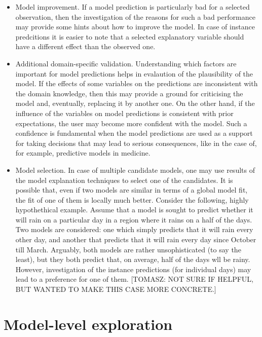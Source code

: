 \documentclass[12pt,]{krantz}
\begin{document}
\begin{itemize}
\item
  Model improvement. If a model prediction is particularly bad for a selected observation, then the investigation of the reasons for such a bad performance may provide some hints about how to improve the model. In case of instance predcitions it is easier to note that a selected explanatory variable should have a different effect than the observed one.
\item
  Additional domain-specific validation. Understanding which factors are important for model predictions helps in evalaution of the plausibility of the model. If the effects of some variables on the predictions are inconsistent with the domain knowledge, then this may provide a ground for criticising the model and, eventually, replacing it by another one. On the other hand, if the influence of the variables on model predictions is consistent with prior expectations, the user may become more confident with the model. Such a confidence is fundamental when the model predictions are used as a support for taking decisions that may lead to serious consequences, like in the case of, for example, predictive models in medicine.
\item
  Model selection. In case of multiple candidate models, one may use results of the model explanation techniques to select one of the candidates. It is possible that, even if two models are similar in terms of a global model fit, the fit of one of them is locally much better. Consider the following, highly hypothethical example. Assume that a model is sought to predict whether it will rain on a particular day in a region where it rains on a half of the days. Two models are considered: one which simply predicts that it will rain every other day, and another that predicts that it will rain every day since October till March. Arguably, both models are rather unsophisticated (to say the least), but they both predict that, on average, half of the days wll be rainy. However, investigation of the instance predictions (for individual days) may lead to a preference for one of them. {[}TOMASZ: NOT SURE IF HELPFUL, BUT WANTED TO MAKE THIS CASE MORE CONCRETE.{]}
\end{itemize}

\hypertarget{modelLevelExploration}{%
\section{Model-level exploration}\label{modelLevelExploration}}
\end{document}
